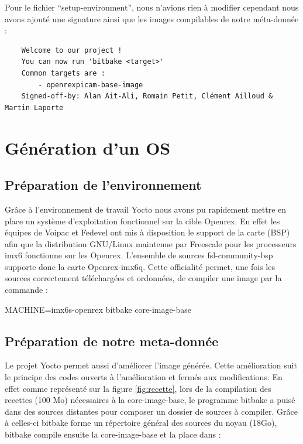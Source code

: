 Pour le fichier “setup-environment”, nous n’avions rien à modifier cependant nous avons
ajouté une signature ainsi que les images compilables de notre méta-donnée :

\begin{lstlisting}
    Welcome to our project !
    You can now run 'bitbake <target>'
    Common targets are :
        - openrexpicam-base-image
    Signed-off-by: Alan Ait-Ali, Romain Petit, Clément Ailloud & Martin Laporte
\end{lstlisting}

\section{Génération d'un OS}

\subsection{Préparation de l'environnement}

Grâce à l’environnement de travail Yocto nous avons pu rapidement mettre en place un
système d’exploitation fonctionnel sur la cible Openrex. En effet les équipes de Voipac et
Fedevel ont mis à disposition le support de la carte (BSP) afin que la distribution
GNU/Linux maintenue par Freescale pour les processeurs imx6 fonctionne sur les
Openrex. L’ensemble de sources fsl-community-bsp supporte donc la carte
Openrex-imx6q. Cette officialité permet, une fois les sources correctement téléchargées et
ordonnées, de compiler une image par la commande :

\begin{tcolorbox}
    MACHINE=imx6s-openrex bitbake core-image-base
\end{tcolorbox}

\subsection{Préparation de notre meta-donnée}

Le projet Yocto permet aussi d’améliorer l’image générée. Cette amélioration suit le principe des
codes ouverts à l’amélioration et fermés aux modifications. En effet comme représenté sur la
figure \ref{fig:recette}, lors de la compilation des recettes (100 Mo) nécessaires à la core-image-base, le
programme bitbake a puisé dans des sources distantes pour composer un dossier de sources à compiler. 
Grâce à celles-ci bitbake forme un répertoire général des sources du noyau (18Go), bitbake compile 
ensuite la core-image-base et la place dans :  \medskip

